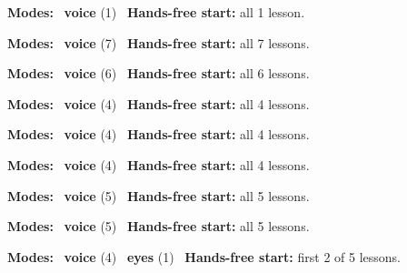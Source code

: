 \expandafter\def\csname hlchaptermodality40\endcsname{%
  {\small\noindent
    \textbf{Modes:} \hlvoicesign{}~\textbf{voice} (1)\quad
    \hlvoicesign{}~\textbf{Hands-free start:} all 1 lesson.%
    \par}\medskip
}

\expandafter\def\csname hlchaptermodality41\endcsname{%
  {\small\noindent
    \textbf{Modes:} \hlvoicesign{}~\textbf{voice} (7)\quad
    \hlvoicesign{}~\textbf{Hands-free start:} all 7 lessons.%
    \par}\medskip
}

\expandafter\def\csname hlchaptermodality42\endcsname{%
  {\small\noindent
    \textbf{Modes:} \hlvoicesign{}~\textbf{voice} (6)\quad
    \hlvoicesign{}~\textbf{Hands-free start:} all 6 lessons.%
    \par}\medskip
}

\expandafter\def\csname hlchaptermodality43\endcsname{%
  {\small\noindent
    \textbf{Modes:} \hlvoicesign{}~\textbf{voice} (4)\quad
    \hlvoicesign{}~\textbf{Hands-free start:} all 4 lessons.%
    \par}\medskip
}

\expandafter\def\csname hlchaptermodality44\endcsname{%
  {\small\noindent
    \textbf{Modes:} \hlvoicesign{}~\textbf{voice} (4)\quad
    \hlvoicesign{}~\textbf{Hands-free start:} all 4 lessons.%
    \par}\medskip
}

\expandafter\def\csname hlchaptermodality45\endcsname{%
  {\small\noindent
    \textbf{Modes:} \hlvoicesign{}~\textbf{voice} (4)\quad
    \hlvoicesign{}~\textbf{Hands-free start:} all 4 lessons.%
    \par}\medskip
}

\expandafter\def\csname hlchaptermodality46\endcsname{%
  {\small\noindent
    \textbf{Modes:} \hlvoicesign{}~\textbf{voice} (5)\quad
    \hlvoicesign{}~\textbf{Hands-free start:} all 5 lessons.%
    \par}\medskip
}

\expandafter\def\csname hlchaptermodality47\endcsname{%
  {\small\noindent
    \textbf{Modes:} \hlvoicesign{}~\textbf{voice} (5)\quad
    \hlvoicesign{}~\textbf{Hands-free start:} all 5 lessons.%
    \par}\medskip
}

\expandafter\def\csname hlchaptermodality48\endcsname{%
  {\small\noindent
    \textbf{Modes:} \hlvoicesign{}~\textbf{voice} (4) \quad \hlsightsign{}~\textbf{eyes} (1)\quad
    \hlvoicesign{}~\textbf{Hands-free start:} first 2 of 5 lessons.%
    \par}\medskip
}

